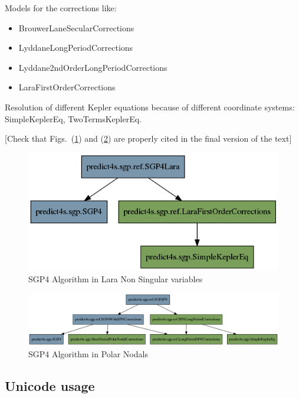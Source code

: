 \documentclass{article}
\begin{document}
Models for the corrections like:
\begin{itemize}
\item BrouwerLaneSecularCorrections
\item LyddaneLongPeriodCorrections
\item Lyddane2ndOrderLongPeriodCorrections
\item LaraFirstOrderCorrections
\end{itemize}

Resolution of different Kepler equations because of
different coordinate systems: SimpleKeplerEq, TwoTermsKeplerEq.

[{\color{red}Check that Figs.~(\ref{fig:res}) and (\ref{fig:res0}) are properly cited in the final version of the text}]

\begin{figure}[htb]
  \centering
	\includegraphics[width=\linewidth]{lara.png}
\caption{SGP4 Algorithm in Lara Non Singular variables}
\label{fig:res}
\end{figure}

\begin{figure}[htb]
  \centering
	\includegraphics[width=\linewidth]{pn.png}
\caption{SGP4 Algorithm in Polar Nodals}
\label{fig:res0}
\end{figure}

\subsection{Unicode usage}
\label{sec:unicodeusage}
\end{document}
